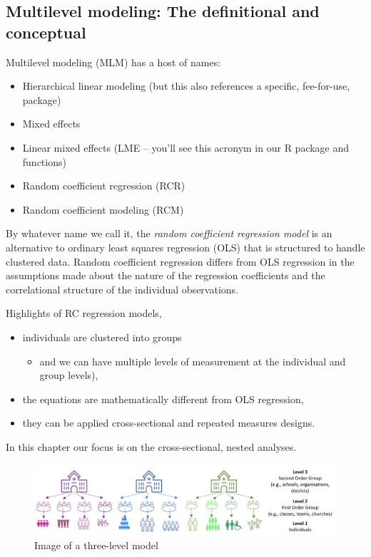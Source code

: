 \documentclass[
  11pt,
]{book}
\providecommand{\tightlist}{%
  \setlength{\itemsep}{0pt}\setlength{\parskip}{0pt}}
\begin{document}
\hypertarget{multilevel-modeling-the-definitional-and-conceptual}{%
\subsection{Multilevel modeling: The definitional and conceptual}\label{multilevel-modeling-the-definitional-and-conceptual}}

Multilevel modeling (MLM) has a host of names:

\begin{itemize}
\tightlist
\item
  Hierarchical linear modeling (but this also references a specific, fee-for-use, package)
\item
  Mixed effects
\item
  Linear mixed effects (LME -- you'll see this acronym in our R package and functions)
\item
  Random coefficient regression (RCR)
\item
  Random coefficient modeling (RCM)
\end{itemize}

By whatever name we call it, the \emph{random coefficient regression model} is an alternative to ordinary least squares regression (OLS) that is structured to handle clustered data. Random coefficient regression differs from OLS regression in the assumptions made about the nature of the regression coefficients and the correlational structure of the individual observations.

Highlights of RC regression models,

\begin{itemize}
\tightlist
\item
  individuals are clustered into groups

  \begin{itemize}
  \tightlist
  \item
    and we can have multiple levels of measurement at the individual and group levels),
  \end{itemize}
\item
  the equations are mathematically different from OLS regression,
\item
  they can be applied cross-sectional and repeated measures designs.
\end{itemize}

In this chapter our focus is on the cross-sectional, nested analyses.

\begin{figure}
\centering
\includegraphics{images/wiGroups/nesting.jpg}
\caption{Image of a three-level model}
\end{figure}
\end{document}
